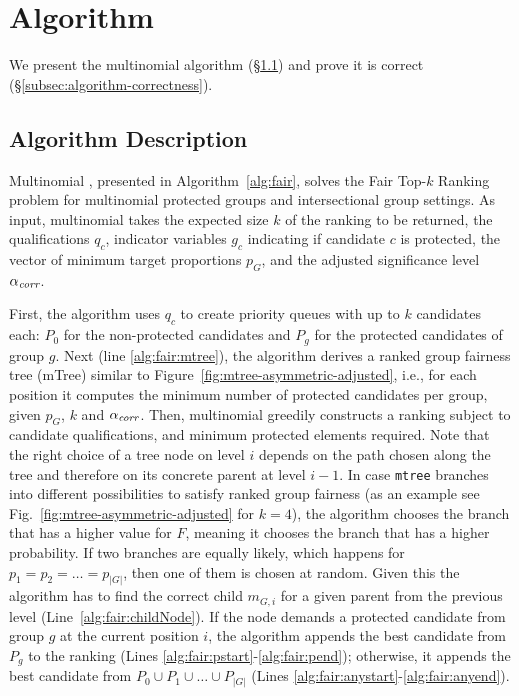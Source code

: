 \section{Algorithm}\label{sec:algorithms}
We present the multinomial \algoFAIR algorithm (\S\ref{subsec:algorithm-description}) and prove it is correct (\S\ref{subsec:algorithm-correctness}).

\subsection{Algorithm Description}\label{subsec:algorithm-description}
Multinomial \algoFAIR, presented in Algorithm~\ref{alg:fair}, solves the {\sc Fair Top-$k$ Ranking} problem for multinomial protected groups and intersectional group settings.
%
As input, multinomial \algoFAIR takes 
the expected size $k$ of the ranking to be returned,
the qualifications $q_c$, 
indicator variables $g_c$ indicating if candidate $c$ is protected,
the vector of minimum target proportions $p_G$, and
the adjusted significance level $\alpha_\textit{corr}$.

First, the algorithm uses $q_c$ to create priority queues with up to $k$ candidates each: $P_0$ for the non-protected candidates and $P_g$ for the protected candidates of group $g$.
%
Next (line \ref{alg:fair:mtree}), the algorithm derives a ranked group fairness tree (mTree) similar to Figure~\ref{fig:mtree-asymmetric-adjusted}, i.e., for each position it computes the minimum number of protected candidates per group, given $p_G$, $k$ and $\alpha_\textit{corr}$.
%
Then, multinomial \algoFAIR greedily constructs a ranking subject to candidate qualifications, and minimum protected elements required.
%
Note that the right choice of a tree node on level $i$ depends on the path chosen along the tree and therefore on its concrete parent at level $i-1$. 
%
In case \texttt{mtree} branches into different possibilities to satisfy ranked group fairness (as an example see Fig.~\ref{fig:mtree-asymmetric-adjusted} for $k=4$), the algorithm chooses the branch that has a higher value for $F$, meaning it chooses the branch that has a higher probability.
%
If two branches are equally likely, which happens for $p_1 = p_2 = \ldots = p_{|G|}$, then one of them is chosen at random.
%
Given this the algorithm has to find the correct child $m_{G,i}$ for a given parent from the previous level (Line~\ref{alg:fair:childNode}).
%
If the node demands a protected candidate from group $g$ at the current position $i$, the algorithm appends the best candidate from $P_g$ to the ranking (Lines \ref{alg:fair:pstart}-\ref{alg:fair:pend}); otherwise, it appends the best candidate from $P_0 \cup P_1 \cup \ldots \cup P_{|G|}$ (Lines \ref{alg:fair:anystart}-\ref{alg:fair:anyend}).
%

